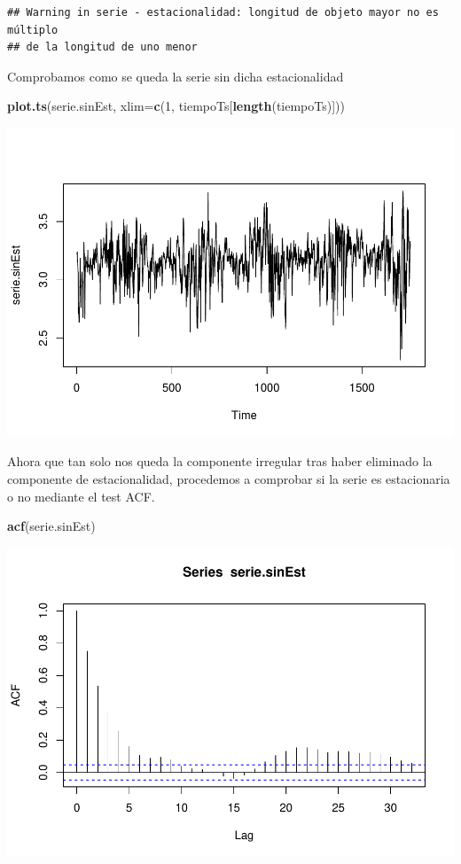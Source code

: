 \documentclass[]{article}
\newenvironment{Shaded}{\begin{snugshade}}{\end{snugshade}}
\newcommand{\KeywordTok}[1]{\textcolor[rgb]{0.13,0.29,0.53}{\textbf{#1}}}
\newcommand{\DataTypeTok}[1]{\textcolor[rgb]{0.13,0.29,0.53}{#1}}
\newcommand{\DecValTok}[1]{\textcolor[rgb]{0.00,0.00,0.81}{#1}}
\newcommand{\NormalTok}[1]{#1}
\begin{document}
\begin{verbatim}
## Warning in serie - estacionalidad: longitud de objeto mayor no es múltiplo
## de la longitud de uno menor
\end{verbatim}

Comprobamos como se queda la serie sin dicha estacionalidad

\begin{Shaded}
\begin{Highlighting}[]
\KeywordTok{plot.ts}\NormalTok{(serie.sinEst, }\DataTypeTok{xlim=}\KeywordTok{c}\NormalTok{(}\DecValTok{1}\NormalTok{, tiempoTs[}\KeywordTok{length}\NormalTok{(tiempoTs)]))}
\end{Highlighting}
\end{Shaded}

\includegraphics{timeSeries_files/figure-latex/unnamed-chunk-56-1.pdf}

Ahora que tan solo nos queda la componente irregular tras haber
eliminado la componente de estacionalidad, procedemos a comprobar si la
serie es estacionaria o no mediante el test ACF.

\begin{Shaded}
\begin{Highlighting}[]
\KeywordTok{acf}\NormalTok{(serie.sinEst)}
\end{Highlighting}
\end{Shaded}

\includegraphics{timeSeries_files/figure-latex/unnamed-chunk-57-1.pdf}
\end{document}
